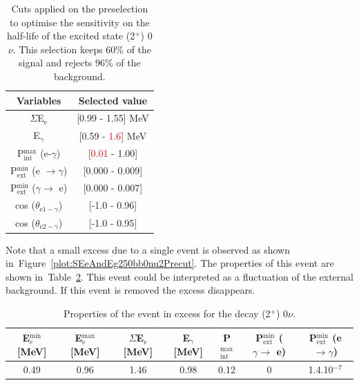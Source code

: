 \documentclass[main.tex]{subfiles}
\begin{document}
\FloatBarrier


\begin{table}[h!]
\centering
\begin{tabular}{c|c}
Variables & Selected value \\
\toprule
$\Sigma$E$_{\text{e}}$ & [0.99 - 1.55] MeV \\
E$_{\gamma}$    & [0.59 - \textcolor{red}{1.6}] MeV \\
P$_{\text{int}}^{\text{max}}$ (e-$\gamma$) & [\textcolor{red}{0.01} - 1.00] \\
P$_{\text{ext}}^{\text{min}}$ (e $\rightarrow \gamma$) & [0.000 - 0.009] \\
P$_{\text{ext}}^{\text{min}}$ ($\gamma \rightarrow$ e) & [0.000 - 0.007] \\
cos ($\theta_{\text{e1}-\gamma}$) & [-1.0 - 0.96] \\
cos ($\theta_{\text{e2}-\gamma}$) & [-1.0 - 0.95] \\
\bottomrule
\end{tabular}
\caption{Cuts applied on the preselection to optimise the sensitivity on the half-life of the excited state (2$^+$) 0$\nu$. This selection keeps 60\% of the signal and rejects 96\% of the background.}
\label{tab:Cuts0nu2Plus250keV}
\end{table}





\NI  Note that a small excess due to a single event is observed as shown in~Figure~\ref{plot:SEeAndEg250bb0nu2Precut}. The properties of this event are shown in~Table~\ref{tab:EventExcessbb0nu2}. This event could be interpreted as a fluctuation of the external background. If this event is removed the excess disappears.


\begin{table}[h!]
\centering
\begin{tabular}{ccccccc}
\hline
E$^{\text{min}}_\text{e}$ [MeV] & E$^{\text{max}}_\text{e}$ [MeV]& $\Sigma$E$_\text{e}$ [MeV]& E$_{\gamma}$ [MeV]& P$_{\text{int}}^{\text{max}}$ & P$_{\text{ext}}^{\text{min}}$ ($\gamma \rightarrow$ e) & P$_{\text{ext}}^{\text{min}}$ (e $ \rightarrow \gamma$) \\
\hline
0.49 & 0.96 & 1.46 & 0.98 & 0.12 & 0 & 1.4.10$^{-\text{7}}$  \\
\hline
\end{tabular}
\caption{Properties of the event in excess for the decay (2$^+$) 0$\nu$.}
\label{tab:EventExcessbb0nu2}
\end{table}
\end{document}
